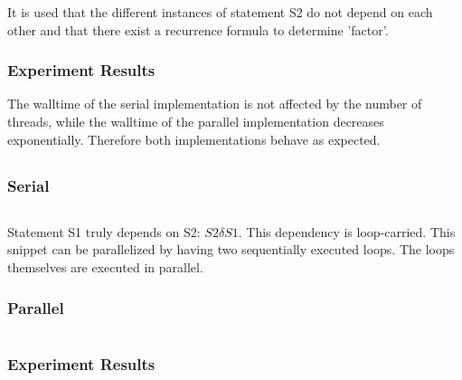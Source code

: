 \documentclass[parskip]{scrartcl}
\begin{document}
	It is used that the different instances of statement S2 do not depend on each other and that there exist a recurrence formula  to determine 'factor'.
	\subsubsection{Experiment Results}
	
	The walltime of the serial implementation is not affected by the number of threads, while the walltime of the parallel implementation decreases exponentially. Therefore both implementations behave as expected.
	\subsection{}
	\subsubsection{Serial}
	\inputminted	[linenos]{c}{ex2/b_ser.h}
	
	Statement S1 truly depends on S2: $S2\delta S1$. This dependency is loop-carried. This snippet can be parallelized by having two sequentially executed loops. The loops themselves are executed in parallel.
	\subsubsection{Parallel}
	\inputminted	[linenos]{c}{ex2/b_par.h}
	\subsubsection{Experiment Results}
	
\end{document}

